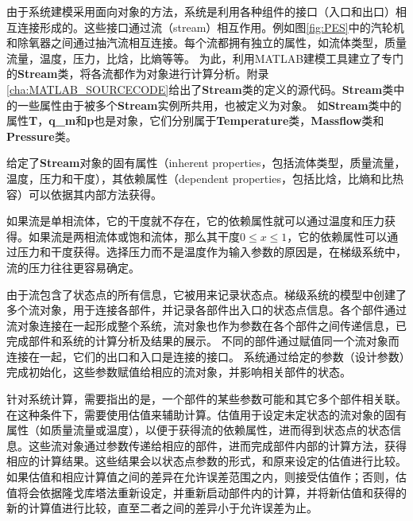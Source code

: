 由于系统建模采用面向对象的方法，系统是利用各种组件的接口（入口和出口）相互连接形成的。这些接口通过流（stream）相互作用。例如图\ref{fig:PES}中的汽轮机和除氧器之间通过抽汽流相互连接。每个流都拥有独立的属性，如流体类型，质量流量，温度，压力，比焓，比熵等等。
为此，利用MATLAB建模工具建立了专门的\textbf{Stream}类，将各流都作为对象进行计算分析。附录\ref{cha:MATLAB_SOURCECODE}给出了\textbf{Stream}类的定义的源代码。\textbf{Stream}类中的一些属性由于被多个\textbf{Stream}实例所共用，也被定义为对象。
如\textbf{Stream}类中的属性\textbf{T}，\textbf{q\_m}和\textbf{p}也是对象，它们分别属于\textbf{Temperature}类，\textbf{Massflow}类和\textbf{Pressure}类。

给定了\textbf{Stream}对象的固有属性（inherent properties，包括流体类型，质量流量，温度，压力和干度），其依赖属性（dependent properties，包括比焓，比熵和比热容）可以依据其内部方法获得。

如果流是单相流体，它的干度就不存在，它的依赖属性就可以通过温度和压力获得。如果流是两相流体或饱和流体，那么其干度$0 \leqslant x \leqslant 1$，它的依赖属性可以通过压力和干度获得。选择压力而不是温度作为输入参数的原因是，在梯级系统中，流的压力往往更容易确定。

由于流包含了状态点的所有信息，它被用来记录状态点。梯级系统的模型中创建了多个流对象，用于连接各部件，并记录各部件出入口的状态点信息。各个部件通过流对象连接在一起形成整个系统，流对象也作为参数在各个部件之间传递信息，已完成部件和系统的计算分析及结果的展示。
不同的部件通过赋值同一个流对象而连接在一起，它们的出口和入口是连接的接口。
系统通过给定的参数（设计参数）完成初始化，这些参数赋值给相应的流对象，并影响相关部件的状态。

针对系统计算，需要指出的是，一个部件的某些参数可能和其它多个部件相关联。
在这种条件下，需要使用估值来辅助计算。估值用于设定未定状态的流对象的固有属性（如质量流量或温度），以便于获得流的依赖属性，进而得到状态点的状态信息。这些流对象通过参数传递给相应的部件，进而完成部件内部的计算方法，获得相应的计算结果。这些结果会以状态点参数的形式，和原来设定的估值进行比较。如果估值和相应计算值之间的差异在允许误差范围之内，则接受估值作；否则，估值将会依据隆戈库塔法重新设定，并重新启动部件内的计算，并将新估值和获得的新的计算值进行比较，直至二者之间的差异小于允许误差为止。

